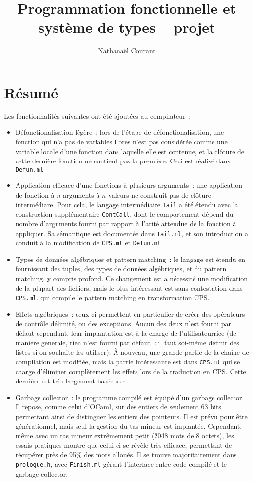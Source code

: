 \documentclass[a4paper,10pt]{article}
\title{Programmation fonctionnelle et système de types -- projet}
\author{Nathanaël Courant}
\begin{document}
\maketitle

\section{Résumé}
Les fonctionnalités suivantes ont été ajoutées au compilateur~:
\begin{itemize}
\item{Défonctionalisation légère~: lors de l'étape de défonctionalisation, une fonction qui n'a pas de variables libres n'est pas considérée comme une variable locale d'une fonction dans laquelle elle est contenue, et la clôture de cette dernière fonction ne contient pas la première. Ceci est réalisé dans \texttt{Defun.ml}}
\item{Application efficace d'une fonctions à plusieurs arguments~: une application de fonction à $n$ arguments à $n$ valeurs ne construit pas de clôture intermédiare. Pour cela, le langage intermédiaire \texttt{Tail} a été étendu avec la construction supplémentaire \texttt{ContCall}, dont le comportement dépend du nombre d'arguments fourni par rapport à l'arité attendue de la fonction à appliquer. Sa sémantique est documentée dans \texttt{Tail.ml}, et son introduction a conduit à la modification de \texttt{CPS.ml} et \texttt{Defun.ml}}
\item{Types de données algébriques et pattern matching~: le langage est étendu en fournissant des tuples, des types de données algébriques, et du pattern matching, y compris profond. Ce changement est a nécessité une modification de la plupart des fichiers, mais le plus intéressant est sans contestation dans \texttt{CPS.ml}, qui compile le pattern matching en transformation CPS.}
\item{Effets algébriques~: ceux-ci permettent en particulier de créer des opérateurs de contrôle délimité, ou des exceptions. Aucun des deux n'est fourni par défaut cependant, leur implantation est à la charge de l'utilisat\textperiodcentered{}eur\textperiodcentered{}rice (de manière générale, rien n'est fourni par défaut~: il faut soi-même définir des listes si on souhaite les utiliser). À nouveau, une grande partie de la chaîne de compilation est modifiée, mais la partie intéressante est dans \texttt{CPS.ml} qui se charge d'éliminer complètement les effets lors de la traduction en CPS. Cette dernière est très largement basée sur \cite{hillerstrom2017continuation}.}
\item{Garbage collector~: le programme compilé est équipé d'un garbage collector. Il repose, comme celui d'OCaml, sur des entiers de seulement 63 bits permettant ainsi de distinguer les entiers des pointeurs. Il est prévu pour être générationnel, mais seul la gestion du tas mineur est implantée. Cependant, même avec un tas mineur extrêmement petit (2048 mots de 8 octets), les essais pratiques montre que celui-ci se révèle très efficace, permettant de récupérer près de 95\%{} des mots alloués. Il se trouve majoritairement dans \texttt{prologue.h}, avec \texttt{Finish.ml} gérant l'interface entre code compilé et le garbage collector.}

\end{itemize}
\end{document}
